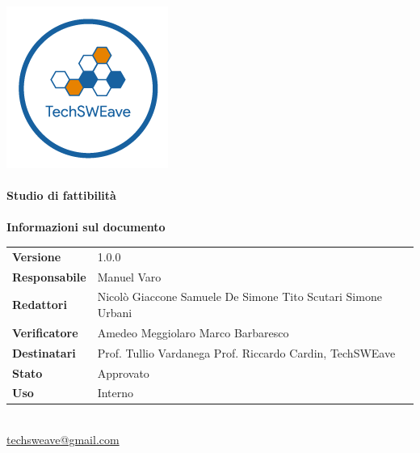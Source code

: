 \documentclass[a4paper]{article}
\begin{document}
\begin{titlepage}
    \begin{center}
        \includegraphics{../../../Images/logo}\\
        \vspace{20px}
        \textcolor{logo}{\hrulefill}\\
        \vspace{20px}
        \textbf{\huge\textcolor{logo}{Studio di fattibilità}}\\
        \vspace{10px}
        \textcolor{logo}{\hrulefill}\\
        \vspace{40px}
        \textbf{\Large Informazioni sul documento}\\
        \vspace{20px}
        \begin{tabular}{p{100px} | p{100px}}
            \textbf{Versione}     & 1.0.0                                                                                   \\
            \textbf{Responsabile} & Manuel Varo                                                                             \\
            \textbf{Redattori}    & Nicolò Giaccone \newline Samuele De Simone \newline Tito Scutari \newline Simone Urbani \\
            \textbf{Verificatore} & Amedeo Meggiolaro \newline Marco Barbaresco                                             \\
            \textbf{Destinatari}  & Prof. Tullio Vardanega \newline Prof. Riccardo Cardin, \newline TechSWEave              \\
            \textbf{Stato}        & Approvato                                                                               \\
            \textbf{Uso}          & Interno                                                                                 \\
        \end{tabular}\\
        \vspace{60px}
        \href{mailto:techsweave@gmail.com}{techsweave@gmail.com}\\

    \end{center}
\end{titlepage}
\end{document}

